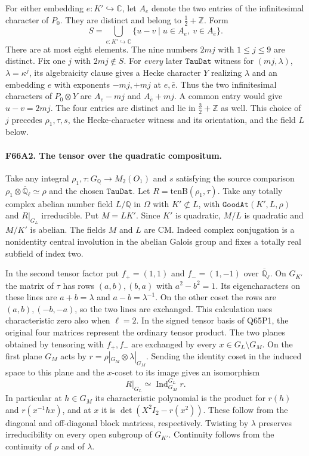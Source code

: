 For either embedding $e:K'\hookrightarrow\mathbb C$, let $A_e$
denote the two entries of the infinitesimal character of $P_0$.
They are distinct and belong to $\tfrac12+\mathbb Z$. Form
\[
 S=\bigcup_{e:K'\hookrightarrow\mathbb C}
        \{u-v\mid u\in A_e,\ v\in A_{\bar e}\}.
\]
There are at most eight elements.  The nine numbers $2mj$ with
$1\le j\le9$ are distinct. Fix one $j$ with $2mj\notin S$.
For \emph{every} later $\texttt{TauDat}$ witness for
$(mj,\lambda)$, $\lambda=\kappa^j$, its algebraicity clause gives
a Hecke character $Y$ realizing $\lambda$ and an embedding $e$
with exponents $-mj,+mj$ at $e,\bar e$. Thus the two
infinitesimal characters of $P_0\otimes Y$ are
$A_e-mj$ and $A_{\bar e}+mj$. A common entry would give
$u-v=2mj$. The four entries are distinct and lie in
$\tfrac32+\mathbb Z$ as well. This choice of $j$ precedes
$\rho_1,\tau,s$, the Hecke-character witness and its orientation,
and the field $L$ below.

\paragraph{F66A2. The tensor over the quadratic compositum.}
Take any integral $\rho_1,\tau:G_{\mathbb Q}\to M_2(O_1)$ and
$s$ satisfying the source comparison $\rho_1\otimes
\overline{\mathbb Q}_\ell\simeq\rho$ and the chosen
$\texttt{TauDat}$.  Let $R=\mathrm{tenB}(\rho_1,\tau)$.
Take any totally complex abelian number field $L/\mathbb Q$
in $\Omega$ with $K'\not\subset L$, with $\texttt{GoodAt}(K',L,\rho)$
and $R|_{G_L}$ irreducible.  Put $M=LK'$.  Since $K'$ is quadratic,
$M/L$ is quadratic and $M/K'$ is abelian. The fields $M$ and $L$
are CM. Indeed complex conjugation is a nonidentity central
involution in the abelian Galois group and fixes a totally real
subfield of index two.

In the second tensor factor put $f_+=(1,1)$ and $f_-=(1,-1)$
over $\overline{\mathbb Q}_\ell$. On $G_{K'}$ the matrix of $\tau$
has rows $(a,b),(b,a)$ with $a^2-b^2=1$. Its eigencharacters
on these lines are $a+b=\lambda$ and $a-b=\lambda^{-1}$.
On the other coset the rows are $(a,b),(-b,-a)$, so the two
lines are exchanged. This calculation uses characteristic zero
also when $\ell=2$. In the signed tensor basis of Q65P1, the
original four matrices represent the ordinary tensor product.
The two planes obtained by tensoring with $f_+,f_-$ are exchanged
by every $x\in G_L\setminus G_M$. On the first plane $G_M$ acts by
$r=\rho|_{G_M}\otimes\lambda|_{G_M}$. Sending the identity coset
in the induced space to this plane and the $x$-coset to its image
gives an isomorphism
\[
             R|_{G_L}\simeq\operatorname{Ind}_{G_M}^{G_L}r.
\]
In particular at $h\in G_M$ its characteristic polynomial is the
product for $r(h)$ and $r(x^{-1}hx)$, and at $x$ it is
$\det(X^2 I_2-r(x^2))$. These follow from the diagonal and
off-diagonal block matrices, respectively. Twisting by $\lambda$
preserves irreducibility on every open subgroup of $G_{K'}$.
Continuity follows from the continuity of $\rho$ and of $\lambda$.

